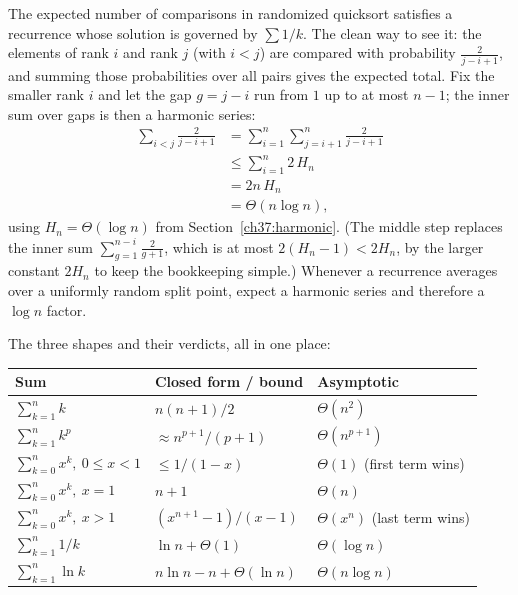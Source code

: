 The expected number of comparisons in randomized quicksort satisfies a recurrence
whose solution is governed by $\sum 1/k$. The clean way to see it: the elements of
rank $i$ and rank $j$ (with $i < j$) are compared with probability
$\tfrac{2}{j-i+1}$, and summing those probabilities over all pairs gives the
expected total. Fix the smaller rank $i$ and let the gap $g = j - i$ run from $1$
up to at most $n-1$; the inner sum over gaps is then a harmonic series:
\begin{align*}
  \sum_{i<j}\frac{2}{j-i+1}
    &= \sum_{i=1}^{n}\sum_{j=i+1}^{n}\frac{2}{j-i+1} \\
    &\le \sum_{i=1}^{n} 2\,H_n \\
    &= 2n\,H_n \\
    &= \Theta(n \log n),
\end{align*}
using $H_n = \Theta(\log n)$ from Section~\ref{ch37:harmonic}. (The middle step
replaces the inner sum $\sum_{g=1}^{n-i}\tfrac{2}{g+1}$, which is at most
$2(H_n - 1) < 2H_n$, by the larger constant $2H_n$ to keep the bookkeeping simple.)
Whenever a recurrence averages over a uniformly random split point, expect a
harmonic series and therefore a $\log n$ factor.

\begin{complexitybox}
The three shapes and their verdicts, all in one place:
\begin{center}
\begin{tabular}{@{}lll@{}}
\toprule
\textbf{Sum} & \textbf{Closed form / bound} & \textbf{Asymptotic} \\
\midrule
$\sum_{k=1}^{n} k$            & $n(n+1)/2$                & $\Theta(n^2)$ \\
$\sum_{k=1}^{n} k^p$          & $\approx n^{p+1}/(p+1)$    & $\Theta(n^{p+1})$ \\
$\sum_{k=0}^{n} x^k,\ 0 \le x < 1$ & $\le 1/(1-x)$             & $\Theta(1)$ (first term wins) \\
$\sum_{k=0}^{n} x^k,\ x=1$    & $n+1$                     & $\Theta(n)$ \\
$\sum_{k=0}^{n} x^k,\ x>1$    & $(x^{n+1}-1)/(x-1)$       & $\Theta(x^n)$ (last term wins) \\
$\sum_{k=1}^{n} 1/k$         & $\ln n + \Theta(1)$        & $\Theta(\log n)$ \\
$\sum_{k=1}^{n} \ln k$       & $n\ln n - n + \Theta(\ln n)$ & $\Theta(n\log n)$ \\
\bottomrule
\end{tabular}
\end{center}
\end{complexitybox}

